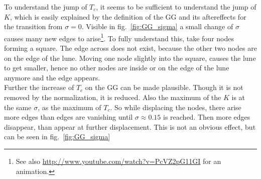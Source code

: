     To understand the jump of \(T_c\), it seems to be sufficient to
    understand the jump of \(K\), which is easily explained
    by the definition of the GG and its aftereffects for
    the transition from \(\sigma = 0\). Visible in fig.\ \ref{fig:GG_sigma}
    a small change of \(\sigma\) causes many new edges to arise\footnote{See also \url{http://www.youtube.com/watch?v=PcVZ2pG11GI} for an animation.}.
    To fully understand this, take four nodes forming a square. The edge
    across does not exist, because the other two nodes are on the edge
    of the lune. Moving one node slightly into the square, causes the lune
    to get smaller, hence no other nodes are inside or on the edge of
    the lune anymore and the edge appears.\\
    Further the increase of \(T_c\) on the GG can be made plausible.
    Though it is not removed by the normalization, it is reduced. Also
    the maximum of the \(K\) is at the same \(\sigma\), as the maximum
    of \(T_c\). So while displacing the nodes, there arise more edges
    than edges are vanishing until \(\sigma \approx 0.15\) is reached.
    Then more edges disappear, than appear at further displacement. This
    is not an obvious effect, but can be seen in fig.\ \ref{fig:GG_sigma}
